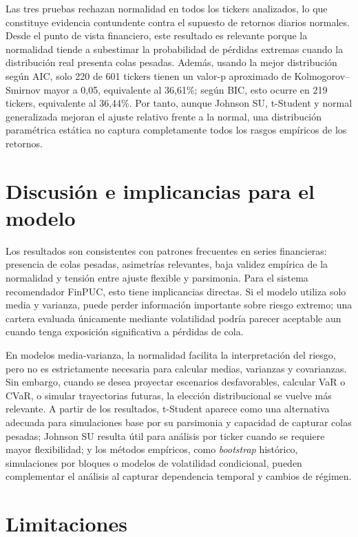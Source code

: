 Las tres pruebas rechazan normalidad en todos los tickers analizados, lo que constituye evidencia contundente contra el supuesto de retornos diarios normales. Desde el punto de vista financiero, este resultado es relevante porque la normalidad tiende a subestimar la probabilidad de p\'erdidas extremas cuando la distribuci\'on real presenta colas pesadas. Adem\'as, usando la mejor distribuci\'on seg\'un AIC, solo 220 de 601 tickers tienen un valor-p aproximado de Kolmogorov--Smirnov mayor a 0,05, equivalente al 36,61\%; seg\'un BIC, esto ocurre en 219 tickers, equivalente al 36,44\%. Por tanto, aunque Johnson SU, t-Student y normal generalizada mejoran el ajuste relativo frente a la normal, una distribuci\'on param\'etrica est\'atica no captura completamente todos los rasgos emp\'iricos de los retornos.

\section*{Discusi\'on e implicancias para el modelo}

Los resultados son consistentes con patrones frecuentes en series financieras: presencia de colas pesadas, asimetr\'ias relevantes, baja validez emp\'irica de la normalidad y tensi\'on entre ajuste flexible y parsimonia. Para el sistema recomendador FinPUC, esto tiene implicancias directas. Si el modelo utiliza solo media y varianza, puede perder informaci\'on importante sobre riesgo extremo; una cartera evaluada \'unicamente mediante volatilidad podr\'ia parecer aceptable aun cuando tenga exposici\'on significativa a p\'erdidas de cola.

En modelos media-varianza, la normalidad facilita la interpretaci\'on del riesgo, pero no es estrictamente necesaria para calcular medias, varianzas y covarianzas. Sin embargo, cuando se desea proyectar escenarios desfavorables, calcular VaR o CVaR, o simular trayectorias futuras, la elecci\'on distribucional se vuelve m\'as relevante. A partir de los resultados, t-Student aparece como una alternativa adecuada para simulaciones base por su parsimonia y capacidad de capturar colas pesadas; Johnson SU resulta \'util para an\'alisis por ticker cuando se requiere mayor flexibilidad; y los m\'etodos emp\'iricos, como \textit{bootstrap} hist\'orico, simulaciones por bloques o modelos de volatilidad condicional, pueden complementar el an\'alisis al capturar dependencia temporal y cambios de r\'egimen.

\section*{Limitaciones}

